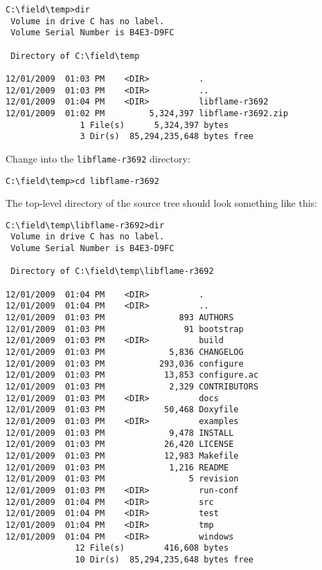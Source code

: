 \begin{Verbatim}[frame=single,framesep=2.5mm,xleftmargin=5mm,fontsize=\footnotesize]
C:\field\temp>dir
 Volume in drive C has no label.
 Volume Serial Number is B4E3-D9FC

 Directory of C:\field\temp

12/01/2009  01:03 PM    <DIR>          .
12/01/2009  01:03 PM    <DIR>          ..
12/01/2009  01:04 PM    <DIR>          libflame-r3692
12/01/2009  01:02 PM         5,324,397 libflame-r3692.zip
               1 File(s)      5,324,397 bytes
               3 Dir(s)  85,294,235,648 bytes free
\end{Verbatim}

\noindent
Change into the {\tt libflame-r3692} directory:

\begin{Verbatim}[frame=single,framesep=2.5mm,xleftmargin=5mm,fontsize=\footnotesize]
C:\field\temp>cd libflame-r3692
\end{Verbatim}

\noindent
The top-level directory of the source tree should look something like this:

\begin{Verbatim}[frame=single,framesep=2.5mm,xleftmargin=5mm,fontsize=\footnotesize]
C:\field\temp\libflame-r3692>dir
 Volume in drive C has no label.
 Volume Serial Number is B4E3-D9FC

 Directory of C:\field\temp\libflame-r3692

12/01/2009  01:04 PM    <DIR>          .
12/01/2009  01:04 PM    <DIR>          ..
12/01/2009  01:03 PM               893 AUTHORS
12/01/2009  01:03 PM                91 bootstrap
12/01/2009  01:03 PM    <DIR>          build
12/01/2009  01:03 PM             5,836 CHANGELOG
12/01/2009  01:03 PM           293,036 configure
12/01/2009  01:03 PM            13,853 configure.ac
12/01/2009  01:03 PM             2,329 CONTRIBUTORS
12/01/2009  01:03 PM    <DIR>          docs
12/01/2009  01:03 PM            50,468 Doxyfile
12/01/2009  01:03 PM    <DIR>          examples
12/01/2009  01:03 PM             9,478 INSTALL
12/01/2009  01:03 PM            26,420 LICENSE
12/01/2009  01:03 PM            12,983 Makefile
12/01/2009  01:03 PM             1,216 README
12/01/2009  01:03 PM                 5 revision
12/01/2009  01:03 PM    <DIR>          run-conf
12/01/2009  01:04 PM    <DIR>          src
12/01/2009  01:04 PM    <DIR>          test
12/01/2009  01:04 PM    <DIR>          tmp
12/01/2009  01:04 PM    <DIR>          windows
              12 File(s)        416,608 bytes
              10 Dir(s)  85,294,235,648 bytes free
\end{Verbatim}

